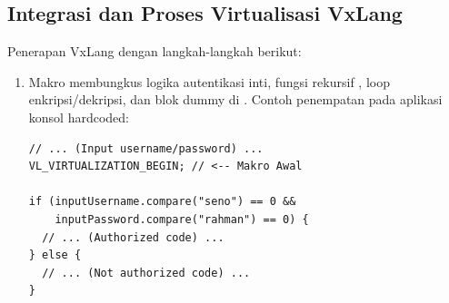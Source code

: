 \subsection{Integrasi dan Proses Virtualisasi VxLang}
Penerapan VxLang  dengan langkah-langkah berikut:

\begin{enumerate}
	\item {} Makro   membungkus logika autentikasi inti, fungsi rekursif , loop enkripsi/dekripsi, dan blok dummy di . Contoh penempatan pada aplikasi konsol hardcoded:
	      \begin{listing}[H]
		      \begin{verbatim}
// ... (Input username/password) ...
VL_VIRTUALIZATION_BEGIN; // <-- Makro Awal

if (inputUsername.compare("seno") == 0 &&
    inputPassword.compare("rahman") == 0) {
  // ... (Authorized code) ...
} else {
  // ... (Not authorized code) ...
}


\end{verbatim}
\end{listing}
\end{enumerate}
